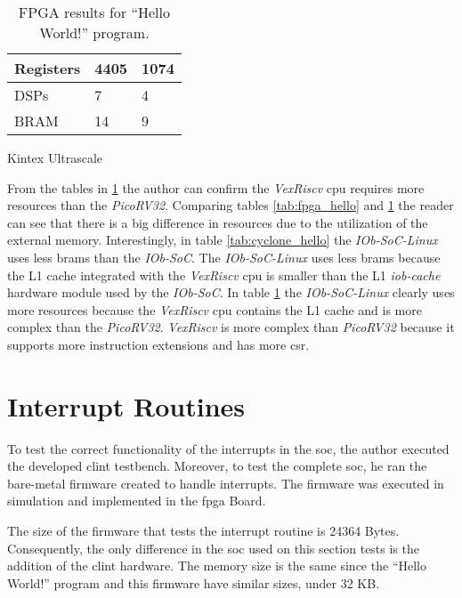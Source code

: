 \begin{table}[!ht]
\begin{subtable}[h]{0.45\textwidth}
\begin{tabular}{l|l|l|}
            \multicolumn{1}{|l|}{Registers} & 4405                   & 1074             \\ \hline
            \multicolumn{1}{|l|}{DSPs}      & 7                      & 4                \\ \hline
            \multicolumn{1}{|l|}{BRAM}      & 14                     & 9                \\ \hline
        \end{tabular}
        \caption{Kintex Ultrascale}
        \label{tab:kintex_hello_int_mem}
     \end{subtable}
     \caption{FPGA results for \enquote{Hello World!} program.}
     \label{tab:fpga_hello_int_mem}
\end{table}

From the tables in \ref{tab:fpga_hello_int_mem} the author can confirm the \textit{VexRiscv} \acrshort{cpu} requires more resources than the \textit{PicoRV32}. Comparing tables \ref{tab:fpga_hello} and \ref{tab:fpga_hello_int_mem} the reader can see that there is a big difference in resources due to the utilization of the external memory. Interestingly, in table \ref{tab:cyclone_hello} the \textit{IOb-SoC-Linux} uses less \acrshort{bram}s than the \textit{IOb-SoC}. The \textit{IOb-SoC-Linux} uses less \acrshort{bram}s because the L1 cache integrated with the \textit{VexRiscv} \acrshort{cpu} is smaller than the L1 \textit{iob-cache} hardware module used by the \textit{IOb-SoC}. In table \ref{tab:fpga_hello_int_mem} the \textit{IOb-SoC-Linux} clearly uses more resources because the \textit{VexRiscv} \acrshort{cpu} contains the L1 cache and is more complex than the \textit{PicoRV32}. \textit{VexRiscv} is more complex than \textit{PicoRV32} because it supports more instruction extensions and has more \acrlong{csr}.

\section{Interrupt Routines}
\label{section:interrupt_routine}
To test the correct functionality of the interrupts in the \acrshort{soc}, the author executed the developed \acrshort{clint} testbench. Moreover, to test the complete \acrshort{soc}, he ran the bare-metal firmware created to handle interrupts. The firmware was executed in simulation and implemented in the \acrshort{fpga} Board.

The size of the firmware that tests the interrupt routine is 24364 Bytes. Consequently, the only difference in the \acrshort{soc} used on this section tests is the addition of the \acrshort{clint} hardware. The memory size is the same since the \enquote{Hello World!} program and this firmware have similar sizes, under 32 KB.

